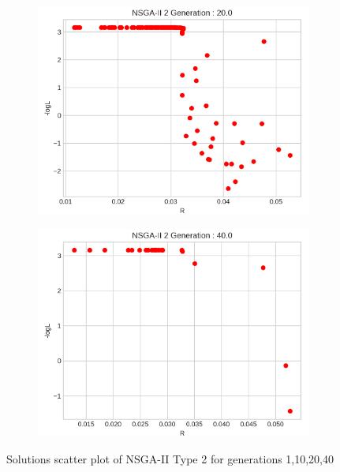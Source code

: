 \begin{figure}[H]
\begin{minipage}[b]{0.22\textwidth}
\begin{figure}[H]
  \end{figure}
  \end{minipage}
  \hspace{0.0cm}
  \begin{minipage}[b]{0.22\textwidth}
  \begin{figure}[H]
      \centering
      \includegraphics[width=\textwidth]{images/1-NSGA-II 2 Generation _ 20.0-R - logL-point.png}
  \end{figure}
  \end{minipage}
  \hspace{0.0cm}
  \begin{minipage}[b]{0.22\textwidth}
  \begin{figure}[H]
      \centering
      \includegraphics[width=\textwidth]{images/1-NSGA-II 2 Generation _ 40.0-R - logL-point.png}
  \end{figure}
  \end{minipage}
  \caption{Solutions scatter plot of NSGA-II Type 2 for generations 1,10,20,40}
  \label{fig:2x2group}
\end{figure}
